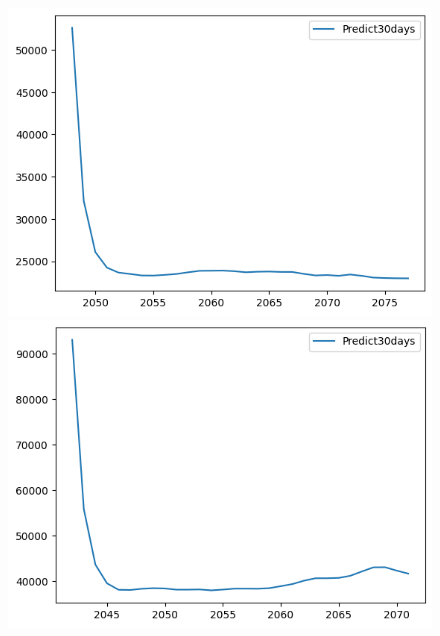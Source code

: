 \begin{figure}[H]
\begin{minipage}{0.15\textwidth}
    \centering
    \includegraphics[width=1\textwidth]{resources/chapter-5/predicted/KF_BIDV_9_1_30days.png}
    \end{minipage}
    \hfill
    \begin{minipage}{0.15\textwidth}
    \centering
    \includegraphics[width=1\textwidth]{resources/chapter-5/predicted/KF_VCB_7_3_30days.png}
    \end{minipage}
    \hfill
    \begin{minipage}{0.15\textwidth}
    \centering

\end{minipage}
\end{figure}
